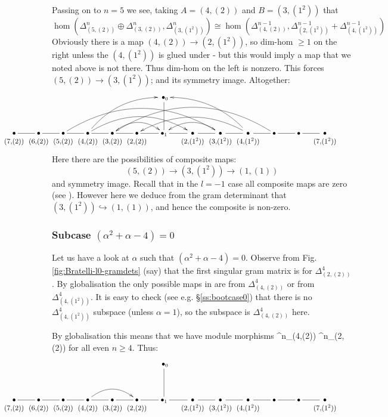 Passing on to $n=5$ we see, taking $A=(4,(2))$ and $B=(3,(1^2))$ that 
\[
\hom(\Delta^{n}_{(5,(2))} \oplus \Delta^{n}_{(3,(2))} , \Delta^{n}_{(3,(1^2))} ) 
 \cong  
\hom(\Delta^{n-1}_{(4,(2))} , \Delta^{n-1}_{(2,(1^2))} + \Delta^{n-1}_{(4,(1^2))}) 
\]
Obviously there is a map $(4,(2))\rightarrow (2,(1^2))$, so dim-hom $\geq 1$ on the right unless the $(4,(1^2))$ is glued under - but this would imply a map that we 
noted above  %
is not there. Thus dim-hom on the left is nonzero. This forces 
$(5,(2))\rightarrow (3,(1^2))$; and its symmetry image. 
Altogether: 
\[
\hspace{-2.1cm} 
\xymatrix{
   &&&&&& \;\bullet_0 \ar@{-}[d] \\
\ver{(7,\!(2))} \ar@{-}[r] & 
\ver{(6,\!(2))} \ar@{-}[r] & 
\ver{(5,\!(2))} \ar@{-}[r] \ar@[green]@/^2.963pc/[rrrrrr] & 
\ver{(4,\!(2))} \ar@{-}[r] \ar@[red]@/^1.3pc/[rrru] \ar@[red]@/^1.9863pc/[rrrr] & 
\ver{(3,\!(2))} \ar@{-}[r] \ar@[red]@/^1.3pc/[rr] & 
\ver{(2,\!(2))} \ar@{-}[r] & 
\bullet_1 \ar@{-}[r] & 
\ver{(2,\!(1^2))} \ar@{-}[r] & 
\ver{(3,\!(1^2))} \ar@{-}[r] \ar@[red]@/_1.3pc/[ll] & 
\ver{(4,\!(1^2))} \ar@{-}[r] \ar@[red]@/_1.3pc/[lllu] \ar@[red]@/_1.93pc/[llll] & 
\bullet \ar@{-}[r] \ar@[green]@/_3.093pc/[llllll] & 
\bullet \ar@{-}[r] & 
\ver{(7,\!(1^2))} & 
}
\] 
Here there are the possibilities of composite maps:
\[
(5,(2)) \rightarrow (3,(1^2)) \rightarrow (1,(1)) 
\]
and symmetry image. Recall that in the $l=-1$ case all composite maps are zero 
(see \cite[Ch.6]{Martin91}).  
However here we deduce from the gram determinant that 
$ (3,(1^2)) \hookrightarrow (1,(1)) $, and hence the composite is non-zero. 

\subsubsection{Subcase  $(\alpha^2 + \alpha -4)=0$}

\mdef  
Let us have a look at $\alpha$ such that $(\alpha^2 + \alpha -4)=0$. 
Observe from Fig.\ref{fig:Bratelli-l0-gramdets} (say) that 
the first singular gram matrix is for  $\Delta^{4}_{(2,(2))}$. 
By globalisation the only possible maps in are from 
$\Delta^{4}_{(4,(2))}$ or from $\Delta^{4}_{(4,(1^2))}$. 
It is easy to check 
(see e.g. \S\ref{ss:bootcase0})
that there is no  $\Delta^4_{(4,(1^2))}$ subspace
(unless $\alpha=1$), 
so the subspace is $\Delta^4_{(4,(2))}$ here. 

By globalisation this means that we have module morphisms 
\beq \label{eq:morphismto22} 
\Delta^n_{(4,(2))}  \rightarrow \Delta^n_{(2,(2))}
\eq 
for all even $n\geq 4$.
Thus:
\[
\hspace{-2.1cm} 
\xymatrix{
   &&&&&& \;\bullet_0 \ar@{-}[d] \\
\ver{(7,\!(2))} \ar@{-}[r] & 
\ver{(6,\!(2))} \ar@{-}[r] & 
\ver{(5,\!(2))} \ar@{-}[r] & 
\ver{(4,\!(2))} \ar@{-}[r] \ar@[red]@/^1.3pc/[rr] & 
\ver{(3,\!(2))} \ar@{-}[r] & 
\ver{(2,\!(2))} \ar@{-}[r] & 
\bullet_1 \ar@{-}[r] & 
\ver{(2,\!(1^2))} \ar@{-}[r] & 
\ver{(3,\!(1^2))} \ar@{-}[r] & 
\ver{(4,\!(1^2))} \ar@{-}[r] & 
\bullet \ar@{-}[r] & 
\bullet \ar@{-}[r] & 
\ver{(7,\!(1^2))} & 
}
\]

